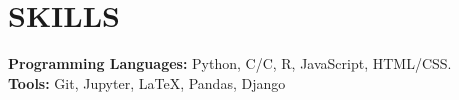 \documentclass[letterpaper, 9pt]{extarticle}
\newcommand{\CPP}{C\nolinebreak\hspace{-.05em}\raisebox{.4ex}{\tiny\bf +}\nolinebreak\hspace{-.10em}\raisebox{.4ex}{\tiny\bf +}}
\begin{document}


   

\section*{SKILLS}
\textbf{Programming Languages:} Python, C/\CPP\@, R, JavaScript, HTML/CSS. \\
\textbf{Tools:} Git, Jupyter, \LaTeX, Pandas, Django
\end{document}
